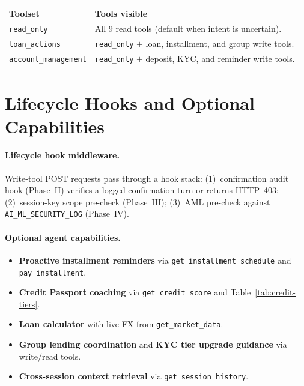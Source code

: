 \documentclass[12pt,a4paper]{report}
\newcommand{\tableheadcolor}{\rowcolor{TableHeadBg}}
\begin{document}
\begin{table}[H]
\centering
\begin{tabular}{p{3.5cm}p{9cm}}
\toprule
\tableheadcolor
\textbf{Toolset} & \textbf{Tools visible} \\
\midrule
\texttt{read\_only} & All 9 read tools (default when intent is uncertain). \\
\texttt{loan\_actions} & \texttt{read\_only} $+$ loan, installment, and group write tools. \\
\texttt{account\_management} & \texttt{read\_only} $+$ deposit, KYC, and reminder write tools. \\
\bottomrule
\end{tabular}
\end{table}

\section{Lifecycle Hooks and Optional Capabilities}

\paragraph{Lifecycle hook middleware.}
Write-tool POST requests pass through a hook stack: (1)~confirmation audit hook (Phase~II) verifies a logged confirmation turn or returns HTTP~403; (2)~session-key scope pre-check (Phase~III); (3)~AML pre-check against \texttt{AI\_ML\_SECURITY\_LOG} (Phase~IV).

\paragraph{Optional agent capabilities.}
\begin{itemize}[noitemsep]
\item \textbf{Proactive installment reminders} via \texttt{get\_installment\_schedule} and \texttt{pay\_installment}.
\item \textbf{Credit Passport coaching} via \texttt{get\_credit\_score} and Table~\ref{tab:credit-tiers}.
\item \textbf{Loan calculator} with live FX from \texttt{get\_market\_data}.
\item \textbf{Group lending coordination} and \textbf{KYC tier upgrade guidance} via write/read tools.
\item \textbf{Cross-session context retrieval} via \texttt{get\_session\_history}.
\end{itemize}
\end{document}
